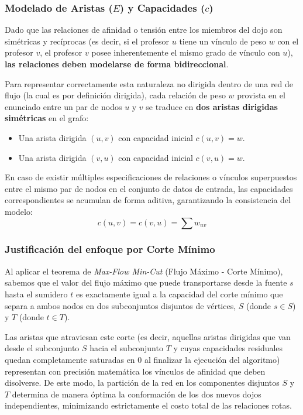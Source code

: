 \documentclass[12pt]{article}
\begin{document}
        \subsubsection{Modelado de Aristas ($E$) y Capacidades ($c$)}

            Dado que las relaciones de afinidad o tensión entre los miembros del dojo son simétricas y recíprocas (es decir, si el profesor $u$ tiene un vínculo de peso $w$ con el profesor $v$, el profesor $v$ posee inherentemente el mismo grado de vínculo con $u$), \textbf{las relaciones deben modelarse de forma bidireccional}. 


            Para representar correctamente esta naturaleza no dirigida dentro de una red de flujo (la cual es por definición dirigida), cada relación de peso $w$ provista en el enunciado entre un par de nodos $u$ y $v$ se traduce en \textbf{dos aristas dirigidas simétricas} en el grafo:

            \begin{itemize}
                \item Una arista dirigida $(u, v)$ con capacidad inicial $c(u, v) = w$.
                \item Una arista dirigida $(v, u)$ con capacidad inicial $c(v, u) = w$.
            \end{itemize}

            En caso de existir múltiples especificaciones de relaciones o vínculos superpuestos entre el mismo par de nodos en el conjunto de datos de entrada, las capacidades correspondientes se acumulan de forma aditiva, garantizando la consistencia del modelo:
            \[
            c(u, v) = c(v, u) = \sum w_{uv}
            \]

        \subsubsection{Justificación del enfoque por Corte Mínimo}

            Al aplicar el teorema de \textit{Max-Flow Min-Cut} (Flujo Máximo - Corte Mínimo), sabemos que el valor del flujo máximo que puede transportarse desde la fuente $s$ hasta el sumidero $t$ es exactamente igual a la capacidad del corte mínimo que separa a ambos nodos en dos subconjuntos disjuntos de vértices, $S$ (donde $s \in S$) y $T$ (donde $t \in T$). 

            Las aristas que atraviesan este corte (es decir, aquellas aristas dirigidas que van desde el subconjunto $S$ hacia el subconjunto $T$ y cuyas capacidades residuales quedan completamente saturadas en $0$ al finalizar la ejecución del algoritmo) representan con precisión matemática los vínculos de afinidad que deben disolverse. De este modo, la partición de la red en los componentes disjuntos $S$ y $T$ determina de manera óptima la conformación de los dos nuevos dojos independientes, minimizando estrictamente el costo total de las relaciones rotas. 
        
\end{document}
